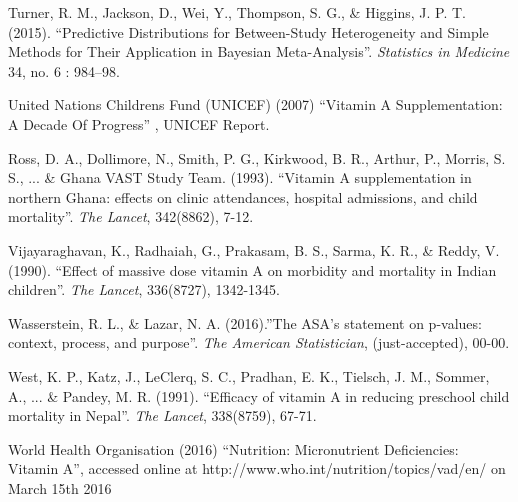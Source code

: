 \documentclass[12pt]{article}
\begin{document}
\begin{thebibliography}{99}
 Turner, R. M., Jackson, D., Wei, Y., Thompson, S. G., \& Higgins, J. P. T. (2015). ``Predictive Distributions for Between-Study Heterogeneity and Simple Methods for Their Application in Bayesian Meta-Analysis''. \emph{Statistics in Medicine} 34, no. 6 : 984–98.

 United Nations Childrens Fund (UNICEF) (2007) ``Vitamin A Supplementation: A Decade Of Progress'' , UNICEF Report. 

 Ross, D. A., Dollimore, N., Smith, P. G., Kirkwood, B. R., Arthur, P., Morris, S. S., ... \& Ghana VAST Study Team. (1993). ``Vitamin A supplementation in northern Ghana: effects on clinic attendances, hospital admissions, and child mortality''. \emph{The Lancet}, 342(8862), 7-12.

 Vijayaraghavan, K., Radhaiah, G., Prakasam, B. S., Sarma, K. R., \& Reddy, V. (1990). ``Effect of massive dose vitamin A on morbidity and mortality in Indian children''. \emph{The Lancet}, 336(8727), 1342-1345.

 Wasserstein, R. L., \& Lazar, N. A. (2016).''The ASA's statement on p-values: context, process, and purpose''. \emph{The American Statistician}, (just-accepted), 00-00.

 West, K. P., Katz, J., LeClerq, S. C., Pradhan, E. K., Tielsch, J. M., Sommer, A., ... \& Pandey, M. R. (1991). ``Efficacy of vitamin A in reducing preschool child mortality in Nepal''. \emph{The Lancet}, 338(8759), 67-71.

 World Health Organisation (2016) ``Nutrition: Micronutrient Deficiencies: Vitamin A'', accessed online at http://www.who.int/nutrition/topics/vad/en/ on March 15th 2016


\end{thebibliography}


\end{document}
